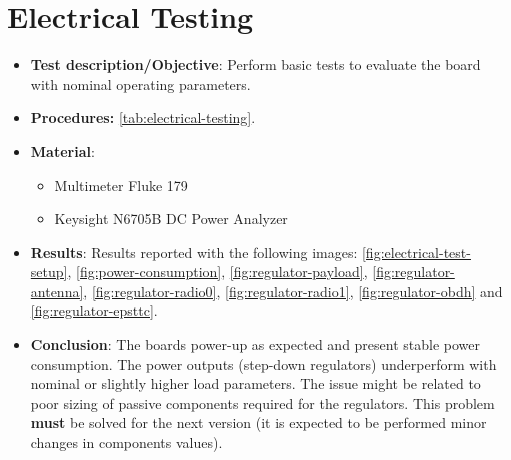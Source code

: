 \section{Electrical Testing}

\begin{itemize}
    \item \textbf{Test description/Objective}: Perform basic tests to evaluate the board with nominal operating parameters.
    \item \textbf{Procedures:} \autoref{tab:electrical-testing}.
    \item \textbf{Material}:
        \begin{itemize}
            \item Multimeter Fluke 179
            \item Keysight N6705B DC Power Analyzer
        \end{itemize}
    \item \textbf{Results}: Results reported with the following images: \ref{fig:electrical-test-setup}, \ref{fig:power-consumption}, \ref{fig:regulator-payload}, \ref{fig:regulator-antenna}, \ref{fig:regulator-radio0}, \ref{fig:regulator-radio1}, \ref{fig:regulator-obdh} and \ref{fig:regulator-epsttc}. 
    \item \textbf{Conclusion}: The boards power-up as expected and present stable power consumption. The power outputs (step-down regulators) underperform with nominal or slightly higher load parameters. The issue might be related to poor sizing of passive components required for the regulators. This problem \textbf{must} be solved for the next version (it is expected to be performed minor changes in components values).  
\end{itemize}

